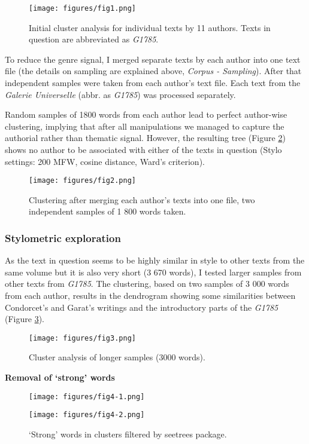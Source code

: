 \documentclass[12pt, letterpaper]{article}
\begin{document}
\begin{figure}
    \centering
    \texttt{[image: figures/fig1.png]}
    \caption{Initial cluster analysis for individual texts by 11 authors. Texts in question are abbreviated as \emph{G1785}.}
    \label{fig1} %
\end{figure}

To reduce the genre signal, I merged separate texts by each author into one text file (the details on sampling are explained above, \emph{Corpus - Sampling}). After that independent samples were taken from each author's text file. Each text from the \emph{Galerie Universelle} (abbr. as \emph{G1785}) was processed separately.

Random samples of 1800 words from each author lead to perfect author-wise clustering, implying that after all manipulations we managed to capture the authorial rather than thematic signal. However, the resulting tree (Figure \ref{fig2}) shows no author to be associated with either of the texts in question (Stylo settings: 200 MFW, cosine distance, Ward's criterion).

\begin{figure}
    \centering
    \texttt{[image: figures/fig2.png]}
    \caption{Clustering after merging each author's texts into one file, two independent samples of 1 800 words taken.}
    \label{fig2}
\end{figure}

\subsubsection{Stylometric exploration}
As the text in question seems to be highly similar in style to other texts from the same volume but it is also very short (3 670 words), I tested larger samples from other texts from \emph{G1785}. The clustering, based on two samples of 3 000 words from each author, results in the dendrogram showing some similarities between Condorcet's and Garat's writings and the introductory parts of the \emph{G1785} (Figure \ref{fig3}).

\begin{figure}
    \centering
    \texttt{[image: figures/fig3.png]}
    \caption{Cluster analysis of longer samples (3000 words).}
    \label{fig3}
\end{figure}

\textbf{Removal of `strong' words}

\begin{figure}
    \centering
    \texttt{[image: figures/fig4-1.png]}
\end{figure}
\begin{figure}
    \centering
    \texttt{[image: figures/fig4-2.png]}
    \caption{`Strong' words in clusters filtered by seetrees package.}
    \label{fig4-2}
\end{figure}
\end{document}
